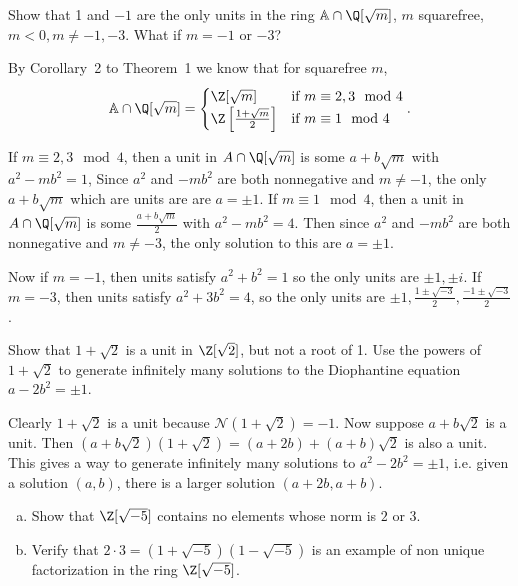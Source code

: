 \documentclass[11pt,letterpaper]{article}
\begin{document}
\begin{cproblem}{2.13}
    Show that 1 and $-1$ are the only units in the ring $\mathbb{A}\cap \Q[\sqrt{m}]$, $m$ squarefree, $m<0,m\neq -1,-3$. What if $m=-1$ or $-3$?    
\end{cproblem}

By Corollary~2 to Theorem~1 we know that for squarefree $m$,
\[
    \mathbb{A}\cap \Q[\sqrt{m}] = \begin{cases}
        \Z[\sqrt{m}]&\textrm{if }m\equiv 2,3\mod 4\\
\Z\left[\frac{1+\sqrt{m}}{2}\right]&\textrm{if }m\equiv 1\mod 4
    \end{cases}
.\] 

If $m\equiv 2,3\mod 4$, then a unit in $A\cap \Q[\sqrt{m}]$ is some $a+b\sqrt{m}$ with $a^2-mb^2=1$, Since $a^2$ and $-mb^2$ are both nonnegative and $m\neq -1$, the only $a+b\sqrt{m}$ which are units are are $a=\pm 1$. If $m\equiv 1\mod 4$, then a unit in $A\cap \Q[\sqrt{m}]$ is some $\frac{a+b\sqrt{m}}{2}$ with $a^2-mb^2=4$. Then since $a^2$ and $-mb^2$ are both nonnegative and $m\neq -3$, the only solution to this are $a=\pm 1$.

Now if $m=-1$, then units satisfy $a^2+b^2=1$ so the only units are $\pm 1, \pm i$. If $m=-3$, then units satisfy $a^2+3b^2=4$, so the only units are $\pm 1, \frac{1\pm \sqrt{-3}}{2}, \frac{-1\pm \sqrt{-3}}{2}$.   

\begin{cproblem}{2.14}
    Show that $1+\sqrt{2}$ is a unit in $\Z[\sqrt{2}]$, but not a root of 1. Use the powers of $1+\sqrt{2}$ to generate infinitely many solutions to the Diophantine equation $a-2b^2=\pm 1$.   
\end{cproblem}

\begin{solution}
    Clearly $1+\sqrt{2}$ is a unit because $\mathcal{N}(1+\sqrt{2})=-1$. Now suppose $a+b\sqrt{2}$ is a unit. Then $(a+b\sqrt{2})(1+\sqrt{2})=(a+2b)+(a+b)\sqrt{2}$ is also a unit. This gives a way to generate infinitely many solutions to $a^2-2b^2=\pm 1$, i.e. given a solution $(a,b)$, there is a larger solution $(a+2b, a+b)$.    
\end{solution}

\begin{cproblem}{2.15}\noindent
    \begin{enumerate}[(a)]
        \item Show that $\Z[\sqrt{-5}]$ contains no elements whose norm is $2$ or $3$.
        \item Verify that $2\cdot 3=(1+\sqrt{-5})(1-\sqrt{-5})$ is an example of non unique factorization in the ring $\Z[\sqrt{-5}]$. 
    \end{enumerate}
\end{cproblem}
\end{document}
